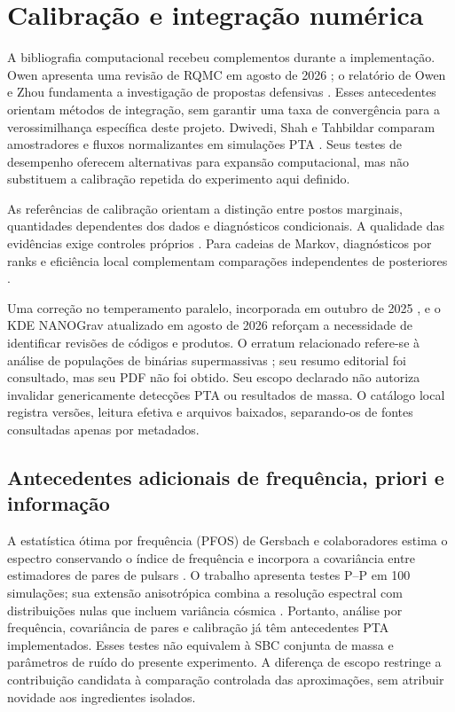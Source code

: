 \section{Calibração e integração numérica}

A bibliografia computacional recebeu complementos durante a implementação.
Owen apresenta uma revisão de RQMC em agosto de 2026
\autocite{owen2026rqmc}; o relatório de Owen e Zhou fundamenta a
investigação de propostas defensivas \autocite{owen_zhou1998}.
Esses antecedentes orientam métodos de integração, sem garantir uma
taxa de convergência para a verossimilhança específica deste projeto.
Dwivedi, Shah e Tahbildar comparam amostradores e fluxos normalizantes
em simulações PTA \autocite{dwivedi2026}. Seus testes de desempenho
oferecem alternativas para expansão computacional, mas não substituem
a calibração repetida do experimento aqui definido.

As referências de calibração \autocite{talts2018,modrak2025,sailynoja2026}
orientam a distinção entre postos marginais, quantidades dependentes dos
dados e diagnósticos condicionais. A qualidade das evidências exige
controles próprios \autocite{modrak2026bayes}. Para cadeias de Markov,
diagnósticos por ranks e eficiência local complementam comparações
independentes de posteriores \autocite{vehtari2021}.

Uma correção no temperamento paralelo, incorporada em outubro de 2025
\autocite{ptmcmc2025fix}, e o KDE NANOGrav atualizado em agosto de 2026
\autocite{nanograv2026kde} reforçam a necessidade de identificar revisões
de códigos e produtos. O erratum relacionado refere-se à análise de
populações de binárias supermassivas \autocite{agazie2026erratum};
seu resumo editorial foi consultado, mas seu PDF não foi obtido.
Seu escopo declarado não autoriza invalidar genericamente detecções
PTA ou resultados de massa. O catálogo local registra versões, leitura
efetiva e arquivos baixados, separando-os de fontes consultadas apenas
por metadados.

\subsection{Antecedentes adicionais de frequência, priori e informação}

A estatística ótima por frequência (PFOS) de Gersbach e colaboradores
estima o espectro conservando o índice de frequência e incorpora a
covariância entre estimadores de pares de pulsars
\autocite{gersbach2025pfos}. O trabalho apresenta testes P--P em
100 simulações; sua extensão anisotrópica combina a resolução espectral
com distribuições nulas que incluem variância cósmica
\autocite{gersbach2026anisotropic}. Portanto, análise por frequência,
covariância de pares e calibração já têm antecedentes PTA implementados.
Esses testes não equivalem à SBC conjunta de massa e parâmetros de
ruído do presente experimento. A diferença de escopo restringe a
contribuição candidata à comparação controlada das aproximações,
sem atribuir novidade aos ingredientes isolados.

